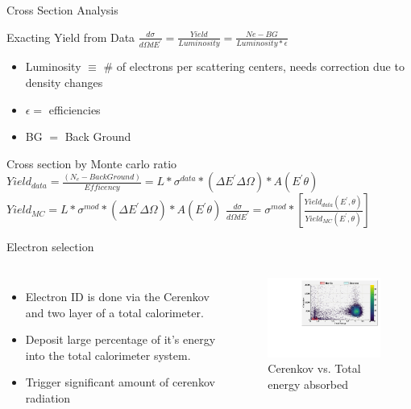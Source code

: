 \documentclass{beamer}
\begin{document}
\begin{frame}{Cross Section Analysis}
	\begin{block}{Exacting Yield from Data}
		\centering
		$\frac{d\sigma}{d\Omega dE^\prime} =  \frac{Yield}{Luminosity} = \frac{Ne - BG }{Luminosity *  \epsilon} $
		\begin{itemize}
			\item Luminosity $\equiv$ \# of electrons per scattering centers, needs correction due to density changes
			\item $\epsilon = $ efficiencies
			\item  BG $ = $ Back Ground
		\end{itemize}
	\end{block}	
	\begin{block}{Cross section by Monte carlo ratio}	
		$ Yield_{data} = \frac{\left(N_e - BackGround\right)}{Efficency } =  \textit{L} *\sigma^{data} * \left( \Delta E^\prime \Delta \Omega\right)*  A \left(E^\prime \theta \right)$
		$ Yield_{MC} = \textit{L} *\sigma^{mod} * \left( \Delta E^\prime \Delta \Omega\right)*  A \left(E^\prime \theta \right)$
		\centering $ \frac{d\sigma}{d\Omega dE^\prime} = \sigma^{mod} * \left[\frac{Yield_{data} \left( 
			E^\prime,\theta\right)} {Yield_{MC}\left(E^\prime,\theta\right)}\right] $
	\end{block}	
\end{frame}
\begin{frame}{Electron selection}
	\begin{block}{}
		\begin{columns}
			\begin{itemize}
 		 		\setlength{\parskip}{0pt}
				\setlength{\itemsep}{0pt plus 1pt}
				\item Electron ID is done via the Cerenkov and two layer of a total calorimeter.
				\item Deposit large percentage of it's energy into the total calorimeter system.
				\item Trigger significant amount of cerenkov radiation
			\end{itemize}		
			\begin{figure}
					\caption{Cerenkov vs. Total energy absorbed}
					\includegraphics[width=7.0cm]{../images/PID_2d.pdf}
			\end{figure}
		\end{columns}
	\end{block}
\end{frame}
\end{document}

